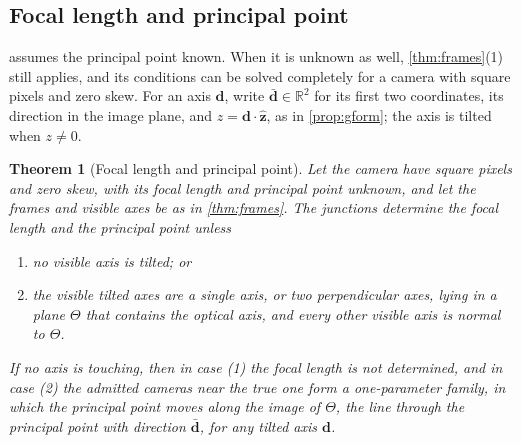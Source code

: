 \documentclass[pdflatex,sn-mathphys-num,iicol]{sn-jnl}
\newcommand{\vd}{\mathbf{d}}
\theoremstyle{thmstyleone}
\newtheorem{theorem}{Theorem}
\theoremstyle{thmstylethree}
\theoremstyle{thmstyletwo}
\begin{document}
\subsection{Focal length and principal point}\label{sec:fpp}

 assumes the principal point known. When it is unknown as well, \cref{thm:frames}(1) still applies, and its conditions can be solved completely for a camera with square pixels and zero skew. For an axis $\vd$, write $\bar{\vd}\in\mathbb R^2$ for its first two coordinates, its direction in the image plane, and $z=\vd\cdot\hat{\mathbf z}$, as in \cref{prop:gform}; the axis is tilted when $z\neq0$.

\begin{theorem}[Focal length and principal point]\label{thm:fpp}
Let the camera have square pixels and zero skew, with its focal length and principal point unknown, and let the frames and visible axes be as in \cref{thm:frames}. The junctions determine the focal length and the principal point unless
\begin{enumerate}
\item no visible axis is tilted; or
\item the visible tilted axes are a single axis, or two perpendicular axes, lying in a plane $\Theta$ that contains the optical axis, and every other visible axis is normal to $\Theta$.
\end{enumerate}
If no axis is touching, then in case (1) the focal length is not determined, and in case (2) the admitted cameras near the true one form a one-parameter family, in which the principal point moves along the image of $\Theta$, the line through the principal point with direction $\bar{\vd}$, for any tilted axis $\vd$.
\end{theorem}
\end{document}
